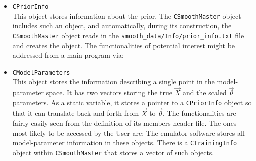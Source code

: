 \documentclass[UserManual.tex]{subfiles}
\begin{document}
\begin{sloppypar}
\begin{itemize}
\item {\tt CPriorInfo}\\
This object stores information about the prior. The {\tt CSmoothMaster} object includes such an object, and automatically, during its construction, the {\tt CSmoothMaster} object reads in the {\tt smooth\_data/Info/prior\_info.txt} file and creates the object. The functionalities of potential interest might be addressed from a main program via:
\vspace*{-8pt}

\item {\tt CModelParameters}\\
This object stores the information describing a single point in the model-parameter space. It has two vectors storing the true $\vec{X}$ and the scaled $\vec{\theta}$ parameters. As a static variable, it stores a pointer to a {\tt CPriorInfo} object so that it can translate back and forth from $\vec{X}$ to $\vec{\theta}$. The functionalities are fairly easily seen from the definition of its members header file. The ones most likely to be accessed by the User are:
\vspace*{-8pt}{\tt \begin{Verbatim}[commandchars=\\\{\}]
 vector<double> X;   // model parameters
 vector<double> Theta; // scaled model parameters
 void TranslateTheta_to_X();  // Given Theta, fill out X
 void TranslateX_to_Theta(); // Given X, fill out Theta
 void Print();    // Prints model parameters
 void Write(string filename);    // Writes model parameters
 void Copy(CModelParameters *mp);  // Copies from another object
 void SetTheta(vector<double> &theta);  // Sets model parameters from vector
 void SetX(vector<double> &X);  // Sets model parameters from vector
\end{Verbatim}
}\vspace*{-8pt}
The emulator software stores all model-parameter information in these objects. There is a {\tt CTrainingInfo} object within {\tt CSmoothMaster} that stores a vector of such objects.


\end{itemize}
\end{sloppypar}
\end{document}
